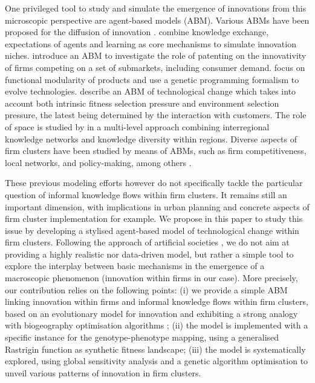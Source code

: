 \documentclass[letterpaper]{article}
\begin{document}
One privileged tool to study and simulate the emergence of innovations from this microscopic perspective are agent-based models (ABM). Various ABMs have been proposed for the diffusion of innovation \citep{kiesling2012agent}. \cite{lopolito2013emerging} combine knowledge exchange, expectations of agents and learning as core mechanisms to simulate innovation niches. \cite{dosi2021patents} introduce an ABM to investigate the role of patenting on the innovativity of firms competing on a set of submarkets, including consumer demand. \cite{chen2006functional} focus on functional modularity of products and use a genetic programming formalism to evolve technologies. \cite{ma2005agent} describe an ABM of technological change which takes into account both intrinsic fitness selection pressure and environment selection pressure, the latest being determined by the interaction with customers. The role of space is studied by \cite{vermeulen2018role} in a multi-level approach combining interregional knowledge networks and knowledge diversity within regions. Diverse aspects of firm clusters have been studied by means of ABMs, such as firm competitiveness, local networks, and policy-making, among others \citep{fioretti2005agent}.

These previous modeling efforts however do not specifically tackle the particular question of informal knowledge flows within firm clusters. It remains still an important dimension, with implications in urban planning and concrete aspects of firm cluster implementation for example. We propose in this paper to study this issue by developing a stylised agent-based model of technological change within firm clusters. Following the approach of artificial societies \citep{epstein1997artificial}, we do not aim at providing a highly realistic nor data-driven model, but rather a simple tool to explore the interplay between basic mechanisms in the emergence of a macroscopic phenomenon (innovation within firms in our case). More precisely, our contribution relies on the following points: (i) we provide a simple ABM linking innovation within firms and informal knowledge flows within firm clusters, based on an evolutionary model for innovation and exhibiting a strong analogy with biogeography optimisation algorithms \citep{simon2008biogeography}; (ii) the model is implemented with a specific instance for the genotype-phenotype mapping, using a generalised Rastrigin function as synthetic fitness landscape; (iii) the model is systematically explored, using global sensitivity analysis and a genetic algorithm optimisation to unveil various patterns of innovation in firm clusters.
\end{document}
